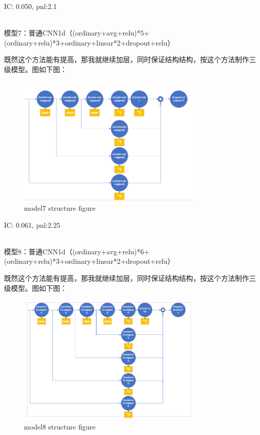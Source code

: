 \documentclass[11pt]{ctexart}
\begin{document}
{\kaishu \small IC: 0.050, pnl:2.1}

~\\
模型7：普通CNN1d（(ordinary+avg+relu)*5+(ordinary+relu)*3+ordinary+linear*2+dropout+relu）

既然这个方法能有提高，那我就继续加层，同时保证结构结构，按这个方法制作三级模型。图如下图：
\begin{figure}[H]
\begin{center}
\includegraphics[width=0.8\textwidth]{str4.PNG}
\end{center}
\caption{model7 structure figure}
\label{FIG.4}
\end{figure}

{\kaishu \small IC: 0.061, pnl:2.25}

~\\
模型8：普通CNN1d（(ordinary+avg+relu)*6+(ordinary+relu)*3+ordinary+linear*2+dropout+relu）

既然这个方法能有提高，那我就继续加层，同时保证结构结构，按这个方法制作三级模型。图如下图：
\begin{figure}[H]
\begin{center}
\includegraphics[width=0.8\textwidth]{str5.PNG}
\end{center}
\caption{model8 structure figure}
\label{FIG.5}
\end{figure}
\end{document}
